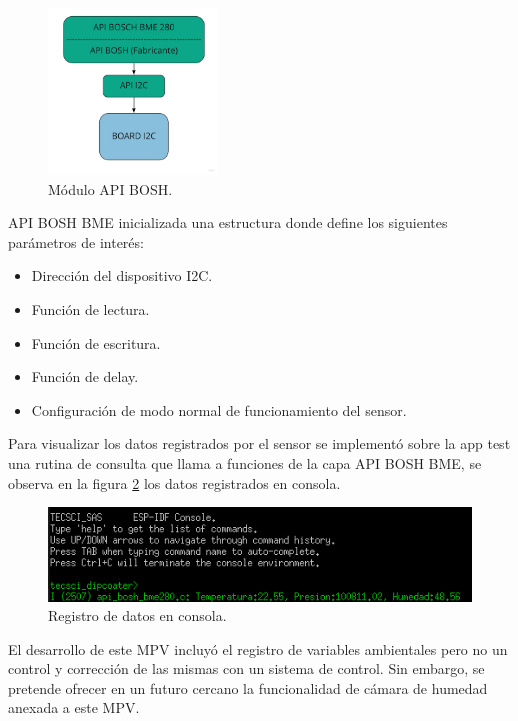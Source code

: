 \begin{figure}[h!]
	\centering
	\includegraphics[width=0.4\textwidth]{./Figures/api_bosh_bme.jpg}
	\caption{Módulo API BOSH.}
	\label{fig:api_bosh}
\end{figure}

API BOSH BME inicializada una estructura donde define los siguientes parámetros de interés:
\begin{itemize}
\item Dirección del dispositivo I2C.
\item Función de lectura.
\item Función de escritura.
\item Función de delay.
\item Configuración de modo normal de funcionamiento del sensor. 
\end{itemize}

Para visualizar los datos registrados por el sensor se implementó sobre la app test una rutina de consulta que llama a funciones de la capa API BOSH BME, se observa en la figura \ref{fig:api_bosh_consola} los datos registrados en consola.

\begin{figure}[h!]
	\centering
	\includegraphics[width=1\textwidth]{./Figures/registro_bme.png}
	\caption{Registro de datos en consola.}
	\label{fig:api_bosh_consola}
\end{figure}

 
El desarrollo de este MPV incluyó el registro de variables ambientales pero no un control y corrección de las mismas con un sistema de control. Sin embargo, se pretende ofrecer en un futuro cercano la funcionalidad de cámara de humedad anexada a este MPV.

